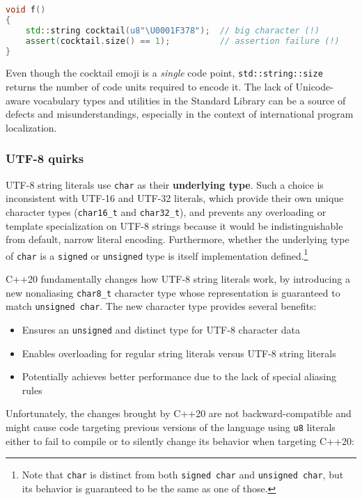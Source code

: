 \begin{lstlisting}[language=C++]
void f()
{
    std::string cocktail(u8"\U0001F378");  // big character (!)
    assert(cocktail.size() == 1);          // assertion failure (!)
}
\end{lstlisting}

\noindent Even though the cocktail emoji is a \emph{single} code point,
\texttt{std::string::size} returns the number of code units required to
encode it. The lack of Unicode-aware vocabulary types and utilities in
the Standard Library can be a source of defects and misunderstandings,
especially in the context of international program localization.

\subsubsection[UTF-8 quirks]{UTF-8 quirks}\label{utf-8-quirks}

UTF-8 string literals use \texttt{char} as their \textbf{underlying type}. Such a
choice is inconsistent with UTF-16 and UTF-32 literals, which provide
their own unique character types (\texttt{char16\_t} and
\texttt{char32\_t}), and prevents any overloading or template
specialization on UTF-8 strings because it would be indistinguishable from
default, narrow literal encoding. Furthermore, whether the underlying
type of \texttt{char} is a \texttt{signed} or \texttt{unsigned} type is
itself implementation defined.{\cprotect\footnote{Note that
\texttt{char} is distinct from both \texttt{signed}~\texttt{char} and
\texttt{unsigned}~\texttt{char}, but its behavior is guaranteed to be
  the same as one of those.}}

C++20
fundamentally changes how UTF-8 string literals work, by introducing a
new nonaliasing \texttt{char8\_t} character type whose representation
is guaranteed to match \texttt{unsigned}~\texttt{char}. The new
character type provides several benefits:
\begin{itemize}
\item{Ensures an \texttt{unsigned} and distinct type for UTF-8 character data}
\item{Enables overloading for regular string literals versus UTF-8 string literals}
\item{Potentially achieves better performance due to the lack of special aliasing rules}
\end{itemize}
Unfortunately, the changes brought by C++20 are not
backward-compatible and might cause code targeting previous versions
of the language using \texttt{u8} literals either to fail to compile
or to silently change its behavior when targeting C++20:

